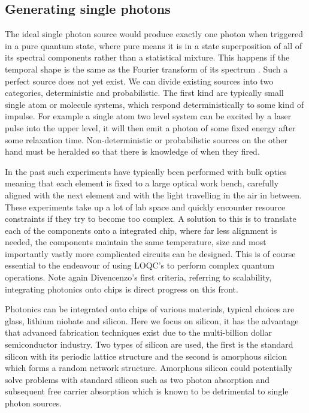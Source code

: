 \subsection{Generating single photons}
The ideal single photon source would produce exactly one photon when triggered in a pure quantum state, where pure means it is in a state superposition of all of its spectral components rather than a statistical mixture. This happens if the temporal shape is the same as the Fourier transform of its spectrum \cite{uren_generation_2007}. Such a perfect source does not yet exist. We can divide existing sources into two categories, deterministic and probabilistic\cite{eisaman_invited_2011}. The first kind are typically small single atom or molecule systems, which respond deterministically to some kind of impulse. For example a single atom two level system can be excited by a laser pulse into the upper level, it will then emit a photon of some fixed energy after some relaxation time. Non-deterministic or probabilistic sources on the other hand must be heralded so that there is knowledge of when they fired. 


In the past such experiments have typically been performed with bulk optics meaning that each element is fixed to a large optical work bench, carefully aligned with the next element and with the light travelling in the air in between. These experiments take up a lot of lab space and quickly encounter resource constraints if they try to become too complex. A solution to this is to translate each of the components onto a integrated chip, where far less alignment is needed, the components maintain the same temperature, size and most importantly vastly more complicated circuits can be designed. This is of course essential to the endeavour of using LOQC's to perform complex quantum operations. Note again Divencenzo's first criteria, referring to scalability, integrating photonics onto chips is direct progress on this front.

Photonics can be integrated onto chips of various materials, typical choices are glass, lithium niobate and silicon. Here we focus on silicon, it has the advantage that advanced fabrication techniques exist due to the multi-billion dollar semiconductor industry. Two types of silicon are used, the first is the standard silicon with its periodic lattice structure and the second is amorphous silcion which forms a random network structure. Amorphous silicon could potentially solve problems with standard silicon such as two photon absorption and subsequent free carrier absorption which is known to be detrimental to single photon sources.

